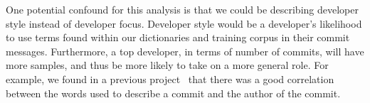 \documentclass[smallextended]{svjour3}       %
\begin{document}
One potential confound for this analysis is that we could be
describing developer style instead of developer focus. Developer style
would be a developer's likelihood to use terms found within
our dictionaries and training corpus in their commit messages. Furthermore, a top developer, in
terms of number of commits, will have more samples, and thus be more likely to 
take on a more general role. For example, we found in a previous
project~\cite{largechanges} that there was a good correlation between the words used to describe a commit
and the author of the commit. 




\end{document}
